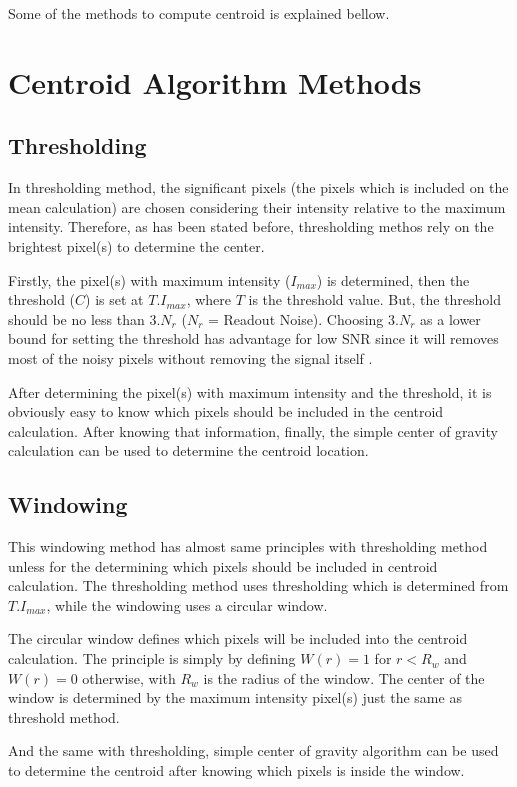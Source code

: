 \documentclass{article}
\begin{document}
Some of the methods to compute centroid is explained bellow.

\section{Centroid Algorithm Methods}

\subsection{Thresholding}

In thresholding method, the significant pixels (the pixels which is included on the mean calculation) are chosen considering their intensity relative to the maximum intensity. Therefore, as has been stated before, thresholding methos rely on the brightest pixel(s) to determine the center.

Firstly, the pixel(s) with maximum intensity ($I_{max}$) is determined, then the threshold ($C$) is set at $T.I_{max}$, where $T$ is the threshold value. But, the threshold should be no less than $3.N_r$ ($N_r$ = Readout Noise). Choosing $3.N_r$ as a lower bound for setting the threshold has advantage for low SNR since it will removes most of the noisy pixels without removing the signal itself \cite{thomas04}.

After determining the pixel(s) with maximum intensity and the threshold, it is obviously easy to know which pixels should be included in the centroid calculation. After knowing that information, finally, the simple center of gravity calculation can be used to determine the centroid location.

\subsection{Windowing}

This windowing method has almost same principles with thresholding method unless for the determining which pixels should be included in centroid calculation. The thresholding method uses thresholding which is determined from $T.I_{max}$, while the windowing uses a circular window. 

The circular window defines which pixels will be included into the centroid calculation. The principle is simply by defining $W(r)=1$ for $r<R_w$ and $W(r)=0$ otherwise, with $R_w$ is the radius of the window. The center of the window is determined by the maximum intensity pixel(s) just the same as threshold method.

And the same with thresholding, simple center of gravity algorithm can be used to determine the centroid after knowing which pixels is inside the window.
\end{document}
